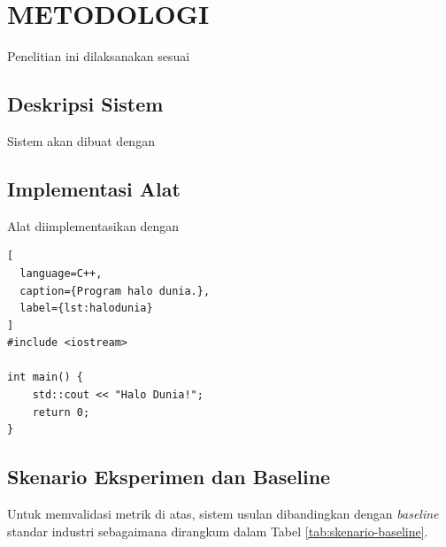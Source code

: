\chapter{METODOLOGI}
\label{chap:metodologi}


Penelitian ini dilaksanakan sesuai \lipsum[1][1-5]

\section{Deskripsi Sistem}
\label{sec:deskripsi-sistem}

Sistem akan dibuat dengan \lipsum[1-2]

\section{Implementasi Alat}
\label{sec:implementasi-alat}

Alat diimplementasikan dengan \lipsum[1]

\begin{lstlisting}[
  language=C++,
  caption={Program halo dunia.},
  label={lst:halodunia}
]
#include <iostream>

int main() {
    std::cout << "Halo Dunia!";
    return 0;
}
\end{lstlisting}

\lipsum[2-3]



\section{Skenario Eksperimen dan Baseline}
\label{subsec:skenario-eksperimen}

Untuk memvalidasi metrik di atas, sistem usulan dibandingkan dengan \textit{baseline} standar industri sebagaimana dirangkum dalam Tabel \ref{tab:skenario-baseline}.

